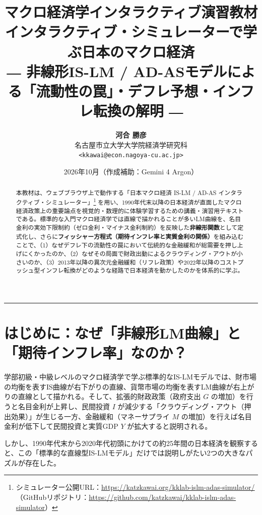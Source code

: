 \documentclass[lualatex,a4paper,11pt,ja=standard]{bxjsarticle}
\title{%
  \vspace{-10mm}
  {\normalsize\bfseries マクロ経済学インタラクティブ演習教材}\\[2mm]
  {\LARGE\bfseries インタラクティブ・シミュレーターで学ぶ日本のマクロ経済}\\[2mm]
  {\large ― 非線形IS-LM / AD-ASモデルによる「流動性の罠」・デフレ予想・インフレ転換の解明 ―}
}
\author{%
  \textbf{河合 勝彦}\\
  {\small 名古屋市立大学大学院経済学研究科}\\
  {\small \texttt{<kkawai@econ.nagoya-cu.ac.jp>}}
}
\date{\small 2026年10月（作成補助：Gemini 4 Argon）}
\begin{document}
\maketitle

\begin{abstract}
\noindent
本教材は、ウェブブラウザ上で動作する「日本マクロ経済 IS-LM / AD-AS インタラクティブ・シミュレーター」\footnote{%
シミュレーター公開URL：\url{https://katzkawai.org/kklab-islm-adas-simulator/} （GitHubリポジトリ：\url{https://github.com/katzkawai/kklab-islm-adas-simulator}）}
を用い、1990年代末以降の日本経済が直面したマクロ経済政策上の重要論点を視覚的・数理的に体験学習するための講義・演習用テキストである。標準的な入門マクロ経済学では直線で描かれることが多いLM曲線を、名目金利の実効下限制約（ゼロ金利・マイナス金利制約）を反映した\textbf{非線形関数}として定式化し、さらに\textbf{フィッシャー方程式（期待インフレ率と実質金利の関係）}を組み込むことで、（1）なぜデフレ下の流動性の罠において伝統的な金融緩和が総需要を押し上げにくかったのか、（2）なぜその局面で財政出動によるクラウディング・アウトが小さいのか、（3）2013年以降の異次元金融緩和（リフレ政策）や2022年以降のコストプッシュ型インフレ転換がどのような経路で日本経済を動かしたのかを体系的に学ぶ。
\end{abstract}

\tableofcontents
\vspace{4mm}
\hrule
\vspace{6mm}

\section{はじめに：なぜ「非線形LM曲線」と「期待インフレ率」なのか？}

学部初級・中級レベルのマクロ経済学で学ぶ標準的なIS-LMモデルでは、財市場の均衡を表すIS曲線が右下がりの直線、貨幣市場の均衡を表すLM曲線が右上がりの直線として描かれる。そして、拡張的財政政策（政府支出 $G$ の増加）を行うと名目金利が上昇し、民間投資 $I$ が減少する「クラウディング・アウト（押出効果）」が生じる一方、金融緩和（マネーサプライ $M$ の増加）を行えば名目金利が低下して民間投資と実質GDP $Y$ が拡大すると説明される。

しかし、1990年代末から2020年代初頭にかけての約25年間の日本経済を観察すると、この「標準的な直線型IS-LMモデル」だけでは説明しがたい2つの大きなパズルが存在した。
\end{document}
